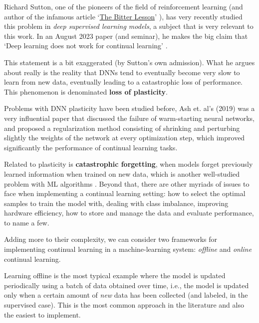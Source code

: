 \documentclass[../main.tex]{subfiles}
\begin{document}
    Richard Sutton, one of the pioneers of the field of reinforcement learning (and author of the infamous article `\href{https://www.cs.utexas.edu/~eunsol/courses/data/bitter_lesson.pdf}{The Bitter Lesson}' \cite{suttonBitterLesson2019}), has very recently studied this problem in \textit{deep supervised learning models}, a subject that is very relevant to this work. In an August 2023 paper (and seminar), he makes the big claim that `Deep learning does not work for continual learning' \cite{dohareLossPlasticityDeep2023}. 
    
    This statement is a bit exaggerated (by Sutton's own admission). What he argues about really is the reality that DNNs tend to eventually become very slow to learn from new data, eventually leading to a catastrophic loss of performance. This phenomenon is denominated \textbf{loss of plasticity}.

    Problems with DNN plasticity have been studied before, Ash et. al's (2019) \cite{ashWarmStartingNeuralNetwork2020} was a very influential paper that discussed the failure of warm-starting neural networks, and proposed a regularization method consisting of shrinking and perturbing slightly the weights of the network at every optimization step, which improved significantly the performance of continual learning tasks.

    Related to plasticity is \textbf{catastrophic forgetting}, when models forget previously learned information when trained on new data, which is another well-studied problem with ML algorithms \cite{mccloskeyCatastrophicInterferenceConnectionist1989,huyen_designing_2022,parisiContinualLifelongLearning2019}. Beyond that, there are other myriads of issues to face when implementing a continual learning setting: how to select the optimal samples to train the model with, dealing with class imbalance, improving hardware efficiency, how to store and manage the data and evaluate performance, to name a few.

     Adding more to their complexity, we can consider two frameworks for implementing continual learning in a machine-learning system: \textit{offline} and \textit{online} continual learning. 
    
    Learning offline is the most typical example where the model is updated periodically using a batch of data obtained over time, i.e., the model is updated only when a certain amount of \textit{new} data has been collected (and labeled, in the supervised case). This is the most common approach in the literature and also the easiest to implement.
    
\end{document}
